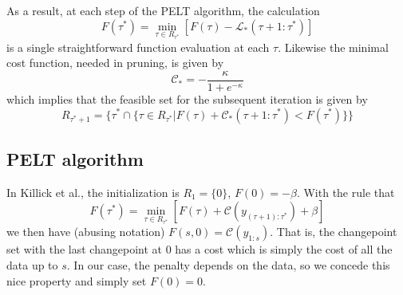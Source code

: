 \documentclass[11pt]{article}
\begin{document}
As a result, at each step of the PELT algorithm, the calculation
\begin{equation}
    F(\tau^*) = \min_{\tau \in R_{\tau^*}} [F(\tau) - \mathcal{L}_*(\tau + 1:\tau^*)]
\end{equation}
is a single straightforward function evaluation at each $\tau$. Likewise the minimal cost function, needed in pruning, is given by
\begin{equation}
    \mathcal{C}_* = - \frac{\kappa}{1 + e^{-\kappa}}
\end{equation}
which implies that the feasible set for the subsequent iteration is given by
\begin{equation}
    R_{\tau^* + 1} = \lbrace \tau^* \cap
    \lbrace
    \tau \in R_{\tau^*} \vert F(\tau) + \mathcal{C}_*(\tau + 1:\tau^*) <
    F(\tau^*)
    \rbrace \rbrace
\end{equation}

\subsection{PELT algorithm}
In Killick et al., the initialization is $R_1 = \lbrace 0 \rbrace$, $F(0) = -\beta$. With the rule that
\begin{equation}
    F(\tau^*) = \min_{\tau \in R_{\tau^*}} [F(\tau) +
    \mathcal{C}(y_{(\tau + 1):\tau^*}) + \beta]
\end{equation}
we then have (abusing notation) $F(s, 0) = \mathcal{C}(y_{1:s})$. That is, the changepoint set with the last changepoint at 0 has a cost which is simply the cost of all the data up to $s$. In our case, the penalty depends on the data, so we concede this nice property and simply set $F(0) = 0$.
\end{document}
